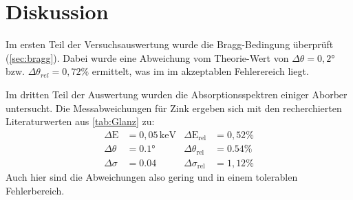 \section{Diskussion}
\label{sec:Diskussion}
Im ersten Teil der Versuchsauswertung wurde die Bragg-Bedingung überprüft (\autoref{sec:bragg}). Dabei wurde eine Abweichung vom Theorie-Wert von $\Delta \theta=0,2°$ bzw. $\Delta \theta_{rel}=0,72\%$ ermittelt, was im im akzeptablen Fehlerereich liegt. \newline 

Im dritten Teil der Auswertung wurden die Absorptionsspektren einiger Aborber untersucht. Die Messabweichungen für Zink ergeben sich mit den recherchierten Literaturwerten aus \autoref{tab:Glanz} zu:
\begin{align*}
    \Delta\text{E}&=0,05 \, \mathrm{keV} & \Delta\text{E}_\text{rel}&=0,52\%\\
    \Delta\theta&=0.1° & \Delta\theta_\text{rel}&=0.54\%\\
    \Delta\sigma&=0.04 & \Delta\sigma_\text{rel}&=1,12\%
\end{align*}
\noindent
Auch hier sind die Abweichungen also gering und in einem tolerablen Fehlerbereich.